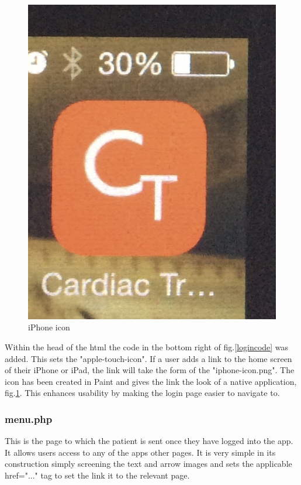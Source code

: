 \documentclass[11pt]{article}
\begin{document}
\begin{figure}
\centering
\includegraphics[scale=0.07]{iphoneicon.png}
\caption{iPhone icon \label{iphoneicon}} 
\end{figure} 
Within the head of the html the code in the bottom right of fig.\ref{logincode} was added. This sets the "apple-touch-icon". If a user adds a link to the home screen of their iPhone or iPad, the link will take the form of the "iphone-icon.png". The icon has been created in Paint \cite{paint} and gives the link the look of a native application, fig.\ref{iphoneicon}. This enhances usability by making the login page easier to navigate to. 

\subsubsection{menu.php}
This is the page to which the patient is sent once they have logged into the app. It allows users access to any of the apps other pages. It is very simple in its construction simply screening the text and arrow images and sets the applicable href="..." tag to set the link it to the relevant page. 
\end{document}
